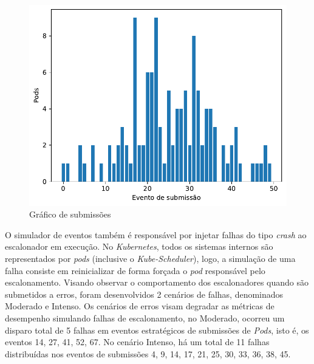 
\begin{figure}[h!]
	\caption{\label{fig:workload-distribution} Gráfico de submissões}
	\centering
	\includegraphics[width=.9\linewidth]{assets/workload-distribution.pdf}
\end{figure}

O simulador de eventos também é responsável por injetar falhas do tipo \textit{crash} ao escalonador em execução. No \textit{Kubernetes}, todos os sistemas internos são representados por \textit{pods} (inclusive o \textit{Kube-Scheduler}), logo, a simulação de uma falha consiste em reinicializar de forma forçada o \textit{pod} responsável pelo escalonamento. Visando observar o comportamento dos escalonadores quando são submetidos a erros, foram desenvolvidos 2 cenários de falhas, denominados Moderado e Intenso. Os cenários de erros visam degradar as métricas de desempenho simulando falhas de escalonamento, no Moderado, ocorreu um disparo total de 5 falhas em eventos estratégicos de submissões de \textit{Pods}, isto é, os eventos 14, 27, 41, 52, 67. No cenário Intenso, há um total de 11 falhas distribuídas nos eventos de submissões 4, 9, 14, 17, 21, 25, 30, 33, 36, 38, 45. 

